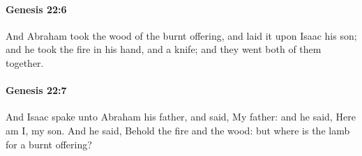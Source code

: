 		\paragraph{Genesis 22:6} %
			\label{GENESIS-22-6}

			And Abraham took the wood of the burnt offering, and laid it upon Isaac his son; and he took the fire in his hand, and a knife; and they went both of them together.


		\paragraph{Genesis 22:7} %
			\label{GENESIS-22-7}

			And Isaac spake unto Abraham his father, and said, My father: and he said, Here am I, my son. And he said, Behold the fire and the wood: but where is the lamb for a burnt offering?


